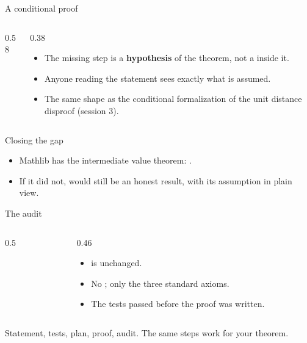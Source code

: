 \documentclass[10pt, aspectratio=169]{beamer}
\begin{document}
\begin{frame}[fragile]{A conditional proof}
\begin{columns}[T]
\begin{column}{0.58\textwidth}
\end{column}
\begin{column}{0.38\textwidth}
\begin{itemize}
\item The missing step is a \textbf{hypothesis} of the theorem, not a  inside it.
\item Anyone reading the statement sees exactly what is assumed.
\item The same shape as the conditional formalization of the unit distance disproof (session 3).
\end{itemize}
\end{column}
\end{columns}
\end{frame}

\begin{frame}[fragile]{Closing the gap}

\vspace{0.3em}
\begin{itemize}
\item Mathlib has the intermediate value theorem: .
\item If it did not,  would still be an honest result, with its assumption in plain view.
\end{itemize}
\end{frame}

\begin{frame}[fragile]{The audit\livedemo}
\begin{columns}[T]
\begin{column}{0.5\textwidth}
\end{column}
\begin{column}{0.46\textwidth}
\begin{itemize}
\item {} is unchanged.
\item No ; only the three standard axioms.
\item The tests passed before the proof was written.
\end{itemize}
\end{column}
\end{columns}

\vspace{0.6em}
\begin{keypoint}
\normalsize Statement, tests, plan, proof, audit. The same steps work for your theorem.
\end{keypoint}
\end{frame}
\end{document}
